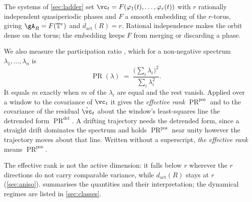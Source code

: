\documentclass[twoside]{article}
\DeclareMathOperator{\PR}{PR}
\begin{document}
The systems of \cref{sec:ladder} set $\vc_t = F(\varphi_1(t), \dots, \varphi_r(t))$ with $r$
rationally independent quasiperiodic phases and $F$ a smooth embedding of the $r$-torus, giving
$\gA_R = F(\mathbb{T}^{r})$ and $d_{\mathrm{act}}(R) = r$. Rational independence makes the orbit
dense on the torus; the embedding keeps $F$ from merging or discarding a phase.

We also measure the participation ratio \citep{gao2017theory}, which for a non-negative spectrum
$\lambda_1, \dots, \lambda_n$ is
\begin{equation}\label{eq:pr}
  \PR(\lambda) \;=\; \frac{\bigl(\sum_i \lambda_i\bigr)^2}{\sum_i \lambda_i^2} .
\end{equation}
It equals $m$ exactly when $m$ of the $\lambda_i$ are equal and the rest vanish. Applied over a
window to the covariance of $\vc_t$ it gives the \emph{effective rank} $\PR^{\mathrm{pos}}$ and to
the covariance of the residual $\tilde{\vc}_t$ about the window's least-squares line the detrended
form $\PR^{\mathrm{det}}$. A drifting trajectory needs the detrended
form, since a straight drift dominates the spectrum and holds $\PR^{\mathrm{pos}}$ near unity
however the trajectory moves about that line. Written without a superscript, \emph{the effective
rank} means $\PR^{\mathrm{pos}}$.

The effective rank is not the active dimension: it falls below $r$ wherever the $r$ directions do
not carry comparable variance, while $d_{\mathrm{act}}(R)$ stays at $r$ (\cref{sec:aniso}).
 summarises the quantities and their interpretation; the dynamical
regimes are listed in \cref{sec:classes}.
\end{document}
